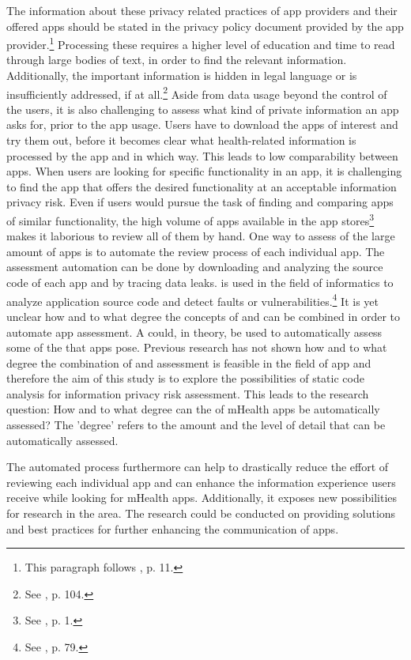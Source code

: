 The information about these privacy related practices of app providers and their offered apps should be stated in the privacy policy document provided by the app provider.\footnote{This paragraph follows \cite{Dehling2014}, p. 11.}
Processing these \pps requires a higher level of education and time to read through large bodies of text, in order to find the relevant information. 
Additionally, the important information is hidden in legal language or is  insufficiently addressed, if at all.\footnote{See \cite{Pollach2007}, p. 104.}
Aside from data usage beyond the control of the users, it is also challenging to assess what kind of private information an app asks for, prior to the app usage. 
Users have to download the apps of interest and try them out, before it becomes clear what health-related information is processed by the app and in which  way. 
This leads to low comparability between apps. 
When users are looking for specific functionality in an \mH app, it is challenging to find the app that offers the desired functionality at an acceptable information privacy risk. 
Even if users would pursue the task of finding and comparing \mH apps of similar functionality, the high volume of apps available in the app stores\footnote{See \cite{Enck2011}, p. 1.} makes it laborious to review all of them by hand.
One way to assess \ipr of the large amount of \mH apps is to automate the review process of each individual app. 
The assessment automation can be done by downloading and analyzing the source code of each app and by tracing data leaks. 
\Sca is used in the field of informatics to analyze application source code and detect faults or vulnerabilities.\footnote{See \cite{Baca2008}, p. 79.} 
It is yet unclear how and to what degree the concepts of \sca and \pra can be combined in order to automate app assessment.
A \sca could, in theory, be used to automatically assess some of the \ipr that \mH apps pose.
Previous research has not shown how and to what degree the combination of \sca and \ipr assessment is feasible in the field of \mH app \pra and therefore the aim of this study is to explore the possibilities of static code analysis for information privacy risk assessment. 
This leads to the research question: How and to what degree can the \ipr of mHealth apps be automatically assessed?
The 'degree' refers to the amount and the level of detail that \iprfs can be automatically assessed.

The automated process furthermore can help to drastically reduce the effort of reviewing each individual app and can enhance the information experience users receive while looking for mHealth apps.
Additionally, it exposes new possibilities for research in the \ipr area. 
The research could be conducted on providing solutions and best practices for further enhancing the \ipr communication of apps.


